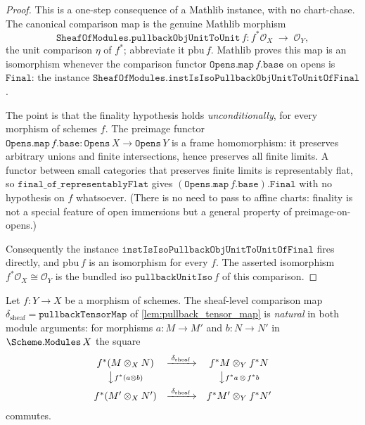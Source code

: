 \begin{proof}
  \leanok
  This is a one-step consequence of a Mathlib instance, with no chart-chase. The
  canonical comparison map is the genuine Mathlib morphism
  \[
    \mathtt{SheafOfModules.pullbackObjUnitToUnit}\,f :
      f^*\mathcal{O}_X \;\longrightarrow\; \mathcal{O}_Y,
  \]
  the unit comparison \(\eta\) of \(f^*\); abbreviate it \(\mathrm{pbu}\,f\). Mathlib
  proves this map is an isomorphism whenever the comparison functor
  \(\mathtt{Opens.map}\,f.\mathtt{base}\) on opens is \(\mathtt{Final}\): the instance
  \(\mathtt{SheafOfModules.instIsIsoPullbackObjUnitToUnitOfFinal}\).

  The point is that the finality hypothesis holds \emph{unconditionally}, for every
  morphism of schemes \(f\). The preimage functor \(\mathtt{Opens.map}\,f.\mathtt{base}
  : \mathtt{Opens}\,X \to \mathtt{Opens}\,Y\) is a frame homomorphism: it preserves
  arbitrary unions and finite intersections, hence preserves all finite limits. A
  functor between small categories that preserves finite limits is representably flat,
  so \(\mathtt{final\_of\_representablyFlat}\) gives \((\mathtt{Opens.map}\,f.\mathtt{base}).\mathtt{Final}\)
  with no hypothesis on \(f\) whatsoever. (There is no need to pass to affine charts:
  finality is not a special feature of open immersions but a general property of
  preimage-on-opens.)

  Consequently the instance \(\mathtt{instIsIsoPullbackObjUnitToUnitOfFinal}\) fires
  directly, and \(\mathrm{pbu}\,f\) is an isomorphism for every \(f\). The asserted
  isomorphism \(f^*\mathcal{O}_X \cong \mathcal{O}_Y\) is the bundled iso
  \(\mathtt{pullbackUnitIso}\,f\) of this comparison.
\end{proof}

\begin{lemma}\leanok
  \label{lem:pullback_tensor_map_natural}
  Let \(f : Y \to X\) be a morphism of schemes. The sheaf-level comparison map
  \(\delta_{\mathrm{sheaf}} = \mathtt{pullbackTensorMap}\) of
  \cref{lem:pullback_tensor_map} is \emph{natural} in both module arguments: for
  morphisms \(a : M \to M'\) and \(b : N \to N'\) in \(\Scheme.\mathtt{Modules}\,X\)
  the square
  \[
    \begin{array}{ccc}
      f^*(M \otimes_X N)
        & \xrightarrow{\;\delta_{\mathrm{sheaf}}\;}
        & f^*M \otimes_Y f^*N \\[2pt]
      \big\downarrow{\scriptstyle f^*(a \otimes b)}
        & & \big\downarrow{\scriptstyle f^*a \,\otimes\, f^*b} \\[4pt]
      f^*(M' \otimes_X N')
        & \xrightarrow{\;\delta_{\mathrm{sheaf}}\;}
        & f^*M' \otimes_Y f^*N'
    \end{array}
  \]
  commutes.
\end{lemma}

